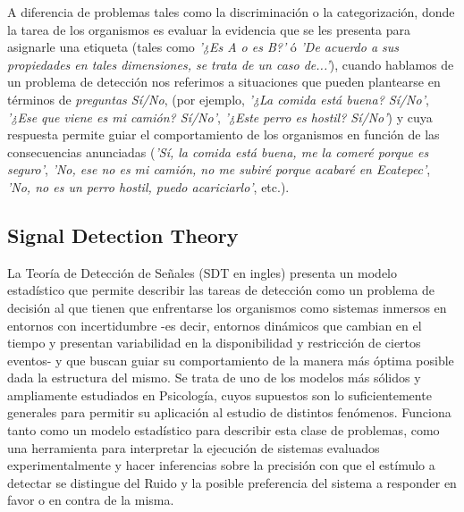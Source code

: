 \documentclass[jou,apacite]{apa6}
\begin{document}
A diferencia de problemas tales como la discriminación o la categorización, donde la tarea de los organismos es evaluar la evidencia que se les presenta para asignarle una etiqueta (tales como \textit{'¿Es A o es B?'} ó \textit{'De acuerdo a sus propiedades en tales dimensiones, se trata de un caso de...'}), cuando hablamos de un problema de detección nos referimos a situaciones que pueden plantearse en términos de \textit{preguntas Sí/No}, (por ejemplo, \textit{'¿La comida está buena? Sí/No'}, \textit{'¿Ese que viene es mi camión? Sí/No'}, \textit{'¿Este perro es hostil? Sí/No'}) y cuya respuesta permite guiar el comportamiento de los organismos en función de las consecuencias anunciadas (\textit{'Sí, la comida está buena, me la comeré porque es seguro'}, \textit{'No, ese no es mi camión, no me subiré porque acabaré en Ecatepec'}, \textit{'No, no es un perro hostil, puedo acariciarlo'}, etc.).\\ 

\subsection{Signal Detection Theory}

La Teoría de Detección de Señales (SDT en ingles) presenta un modelo estadístico que permite describir las tareas de detección como un problema de decisión al que tienen que enfrentarse los organismos como sistemas inmersos en entornos con incertidumbre -es decir, entornos dinámicos que cambian en el tiempo y presentan variabilidad en la disponibilidad y restricción de ciertos eventos- y que buscan guiar su comportamiento de la manera más óptima posible dada la estructura del mismo. Se trata de uno de los modelos más sólidos y ampliamente estudiados en Psicología, cuyos supuestos son lo suficientemente generales para permitir su aplicación al estudio de distintos fenómenos. Funciona tanto como un modelo estadístico para describir esta clase de problemas, como una herramienta para interpretar la ejecución de  sistemas evaluados experimentalmente y hacer inferencias sobre la precisión con que el estímulo a detectar se distingue del Ruido y la posible preferencia del sistema a responder en favor o en contra de la misma.\\
\end{document}
